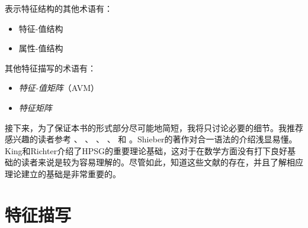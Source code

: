 表示特征结构的其他术语有：
\begin{itemize}
\item 特征-值结构
\item 属性-值结构
\end{itemize}
其他特征描写的术语有：
\begin{itemize}
\item \emph{特征-值矩阵}（AVM）
\item \emph{特征矩阵}
\end{itemize}
接下来，为了保证本书的形式部分尽可能地简短，我将只讨论必要的细节。我推荐感兴趣的读者参考 \citet{Shieber86a}、 \citet[\S~2]{ps}、 \citet{Johnson88}、 \citet{Carpenter92a}、 \citet{King94a}和 \citet{Richter2004a-u}。Shieber的著作对合一语法的介绍浅显易懂。King和Richter介绍了HPSG的重要理论基础，这对于在数学方面没有打下良好基础的读者来说是较为容易理解的。尽管如此，知道这些文献的存在，并且了解相应理论建立的基础是非常重要的。

\section{特征描写}

